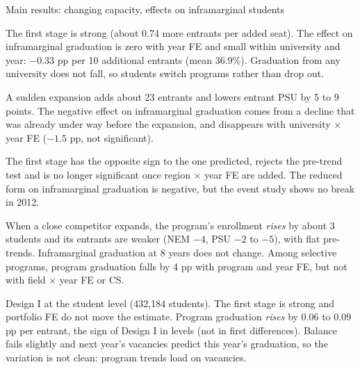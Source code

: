 \documentclass{beamer}
\begin{document}
\begin{frame}{Main results: changing capacity, effects on inframarginal students}
\footnotesize
\begin{description}
    \setlength{\itemsep}{6pt}
    \item[I.] The first stage is strong (about 0.74 more entrants per added seat). The effect on inframarginal graduation is zero with year FE and small within university and year:
    $-0.33$ pp per 10 additional entrants (mean 36.9\%). Graduation from any university does not fall, so students switch programs rather than drop out.
    \item[II.] A sudden expansion adds about 23 entrants and lowers entrant PSU by 5 to 9 points. The negative effect on inframarginal graduation
    comes from a decline that was already under way before the expansion, and disappears with university $\times$ year FE ($-1.5$ pp, not significant).
    \item[III.] The first stage has the opposite sign to the one predicted, rejects the pre-trend test and is no longer significant once region $\times$ year FE are added. The reduced form on inframarginal graduation is negative, but the event study shows no break in 2012.
    \item[IV.] When a close competitor expands, the program's enrollment \emph{rises} by about 3 students and its entrants are weaker (NEM $-4$, PSU $-2$ to $-5$), with flat pre-trends.
    Inframarginal graduation at 8 years does not change. Among selective programs, program graduation falls by 4 pp with program and year FE, but not with field $\times$ year FE or CS.
    \item[V.] Design I at the student level (432,184 students). The first stage is strong and portfolio FE do not move the estimate. Program graduation \emph{rises} by 0.06 to 0.09 pp per entrant, the sign of Design I in levels (not in first differences). Balance fails slightly and next year's vacancies predict this year's graduation, so the variation is not clean: program trends load on vacancies.
\end{description}
\end{frame}
\end{document}
